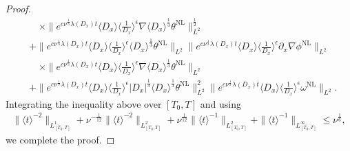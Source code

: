 \documentclass[reqno, 12pt]{amsart} %
\theoremstyle{plain} %
\theoremstyle{definition}
\theoremstyle{remark}
\numberwithin{equation}{section} %
\newcommand{\px}{\partial_x}
\begin{document}
\begin{proof}
{\begin{align*}
				& \quad \times\|e^{c \nu^{\frac{1}{3}} \lambda\left(D_x\right) t}\langle D_x\rangle\langle\frac{1}{D_x}\rangle^\epsilon \nabla  \langle D_x \rangle^{\frac{1}{3}} \theta^{\mathrm{NL}}\|_{L^2}^\frac12 \\
				&+ \|e^{c \nu^{\frac{1}{3}} \lambda\left(D_x\right) t}\langle D_x\rangle    \langle \frac{1}{D_x}\rangle^\epsilon  \langle D_x \rangle^{\frac{1}{3}} \theta^{\mathrm{NL}}\|_{L^2} \|e^{c \nu^{\frac{1}{3}} \lambda\left(D_x\right) t}\langle D_x\rangle\langle\frac{1}{D_x}\rangle^\epsilon \px \nabla \phi^{\mathrm{NL}}\|_{L^2} \\
				& \quad \times\|e^{c \nu^{\frac{1}{3}} \lambda\left(D_x\right) t}\langle D_x\rangle\langle\frac{1}{D_x}\rangle^\epsilon \nabla \langle D_x \rangle^{\frac{1}{3}} \theta^{\mathrm{NL}}\|_{L^2} \\
				&+\|e^{c \nu^{\frac{1}{3}} \lambda\left(D_x\right) t}\langle D_x\rangle    \langle \frac{1}{D_x}\rangle^\epsilon  \left|D_x\right|^{\frac{1}{3}} \langle D_x \rangle^{\frac{1}{3}} \theta^{\mathrm{NL}}\|_{L^2}^2 \|e^{c \nu^{\frac{1}{3}} \lambda\left(D_x\right) t}\langle D_x\rangle\langle\frac{1}{D_x}\rangle^\epsilon \omega^{\mathrm{NL}}\|_{L^2}  .
		\end{align*} }
		Integrating the inequality above over $[T_{0},T]$ and using 
		\begin{equation}\begin{aligned} \label{eq:t}
				\| \langle t \rangle^{-2} \|_{L_{[T_0, T]}^1} + \nu^{-\frac1{12}} \|\langle t \rangle^{-2} \|_{L_{[T_0, T]}^2}  + \nu^{\frac1{12}}\| \langle t \rangle^{-1} \|_{L_{[T_0, T]}^2} + \| \langle t \rangle^{-1} \|_{L_{[T_0, T]}^\infty} \leq \nu^\frac16,
		\end{aligned}\end{equation}
		we complete the proof.

\end{proof}
\end{document}
